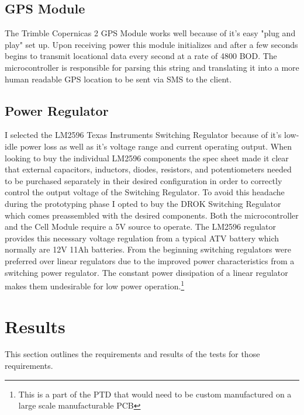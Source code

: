 \documentclass[11pt]{article}
\begin{document}
\subsection{GPS Module}
The Trimble Copernicas 2 GPS Module works well because of it's easy "plug and play" set up. Upon receiving power this module initializes and after a few seconds begins
to transmit locational data every second at a rate of 4800 BOD. The microcontroller is responsible for parsing this string and translating it into a more human readable GPS location 
to be sent via SMS to the client.  


\subsection{Power Regulator}
I selected the LM2596 Texas Instruments Switching Regulator because of it's low-idle power loss as well as it's voltage range and current operating output. When looking
to buy the individual LM2596 components the spec sheet made it clear that external capacitors, inductors, diodes, resistors, and potentiometers needed to be purchased separately
in their desired configuration in order to correctly control the output voltage of the Switching Regulator. To avoid this headache during the prototyping phase I opted
to buy the DROK Switching Regulator which comes preassembled with the desired components. Both the microcontroller and the Cell Module require a 5V source to operate.
The LM2596 regulator provides this necessary voltage regulation from a typical ATV battery which normally are 12V 11Ah batteries. From the beginning switching regulators were
preferred over linear regulators due to the improved power characteristics from a switching power regulator. The constant power dissipation of a linear regulator makes them 
undesirable for low power operation.\footnote{This is a part of the PTD that would need to be custom manufactured on a large scale manufacturable PCB}   


\section{Results}
This section outlines the requirements and results of the tests for those requirements.
\end{document}
